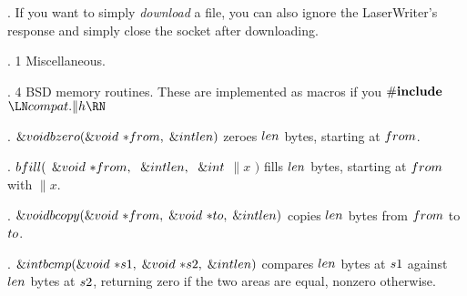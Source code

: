 . If you want to simply {\it download} a file, you can also ignore the
LaserWriter's
response and simply close the socket after downloading.

\fi

. 1 Miscellaneous.

\fi

. 4 BSD memory routines. These are implemented as macros if you \CD{} \8$%
\#{\let\\=\bf \\{include}}${} $\LN\\{compat}.\|h\RN$\DC{}

\fi

. \CD{}$\&{void}\ \\{bzero}(\&{void}\ {*}\\{from},\;\&{int}\ \\{len})$%
\DC{} zeroes \CD{}$\\{len}$\DC{} bytes, starting at \CD{}$\\{from}$\DC{}.

\fi

. \CD{}$\\{bfill}($ $\&{void}\ {{*}}\\{from},\;\ \&{int}\ \\{len},\;\ %
\&{int}$ $\|x$ $)$\DC{} fills \CD{}$\\{len}$\DC{} bytes, starting at \CD{}$%
\\{from}$\DC{} with
\CD{}$\|x$\DC{}.

\fi

. \CD{}$\&{void}\ \\{bcopy}(\&{void}\ {*}\\{from},\;\&{void}\ {*}\\{to},\;%
\&{int}\ \\{len})$\DC{} copies \CD{}$\\{len}$\DC{} bytes from \CD{}$\\{from}$%
\DC{} to
\CD{}$\\{to}$\DC{}.

\fi

. \CD{}$\&{int}\ \\{bcmp}(\&{void}\ {*}\\{s1},\;\&{void}\ {*}\\{s2},\;%
\&{int}\ \\{len})$\DC{} compares \CD{}$\\{len}$\DC{} bytes at \CD{}$\\{s1}$%
\DC{} against
\CD{}$\\{len}$\DC{} bytes at \CD{}$\\{s2}$\DC{}, returning zero if the two
areas are equal, nonzero otherwise.

